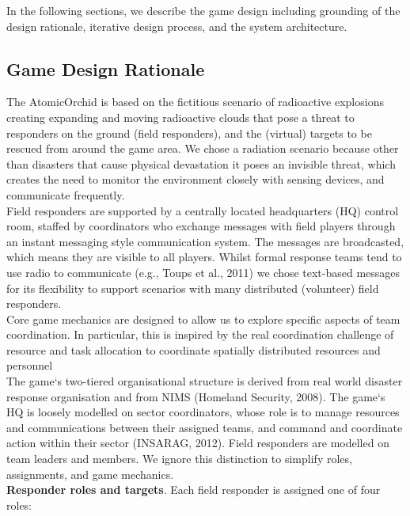 In the following sections, we describe the game design including grounding of the design rationale,  iterative design process, and the system architecture.

\subsection{Game Design Rationale} \label{sec:gameRatinale}
The AtomicOrchid is based on the fictitious scenario of radioactive explosions creating expanding and moving radioactive clouds that pose a threat to responders on the ground (field responders), and the (virtual) targets to be rescued from around the game area. We chose a radiation scenario because other than disasters that cause physical devastation it poses an invisible threat, which creates the need to monitor the environment closely with sensing devices, and communicate frequently.\\

Field responders are supported by a centrally located headquarters (HQ) control room, staffed by coordinators who exchange messages with field players through an instant messaging style communication system. The messages are broadcasted, which means they are visible to all players. Whilst formal response teams tend to use radio to communicate (e.g., Toups et al., 2011) we chose text-based messages for its flexibility to support scenarios with many distributed (volunteer) field responders.\\

Core game mechanics are designed to allow us to explore specific aspects of team coordination. In particular, this is inspired by the real coordination challenge of resource and task allocation to coordinate spatially distributed resources and personnel\\

The game`s two-tiered organisational structure is derived from real world disaster response organisation and from NIMS (Homeland Security, 2008). The game`s HQ is loosely modelled on sector coordinators, whose role is to manage resources and communications between their assigned teams, and command and coordinate action within their sector (INSARAG, 2012). Field responders are modelled on team leaders and members. We ignore this distinction to simplify roles, assignments, and game mechanics.\\

\textbf{Responder roles and targets}. Each field responder is assigned one of four roles:\\

